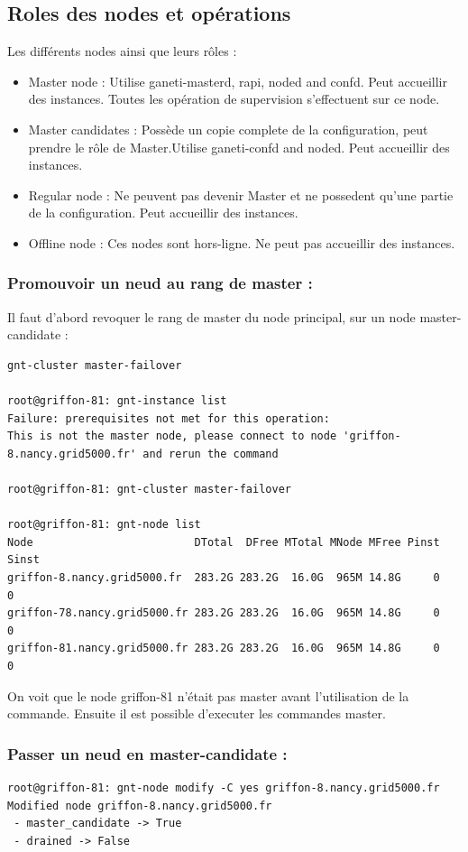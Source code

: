 \subsection {Roles des nodes et opérations}
Les différents nodes ainsi que leurs rôles :
\begin{itemize}
\item Master node : Utilise ganeti-masterd, rapi, noded and confd. Peut accueillir des instances. Toutes les opération de supervision s'effectuent sur ce node.
\item Master candidates : Possède un copie complete de la configuration, peut prendre le rôle de Master.Utilise ganeti-confd and noded. Peut accueillir des instances.
\item Regular node : Ne peuvent pas devenir Master et ne possedent qu'une partie de la configuration. Peut accueillir des instances.
\item Offline node : Ces nodes sont hors-ligne. Ne peut pas accueillir des instances.
\end{itemize}
\subsubsection {Promouvoir un neud au rang de master :}

Il faut d'abord revoquer le rang de master du node principal, sur un node master-candidate :
\begin{lstlisting}
gnt-cluster master-failover

root@griffon-81: gnt-instance list
Failure: prerequisites not met for this operation:
This is not the master node, please connect to node 'griffon-8.nancy.grid5000.fr' and rerun the command

root@griffon-81: gnt-cluster master-failover

root@griffon-81: gnt-node list
Node                         DTotal  DFree MTotal MNode MFree Pinst Sinst
griffon-8.nancy.grid5000.fr  283.2G 283.2G  16.0G  965M 14.8G     0     0
griffon-78.nancy.grid5000.fr 283.2G 283.2G  16.0G  965M 14.8G     0     0
griffon-81.nancy.grid5000.fr 283.2G 283.2G  16.0G  965M 14.8G     0     0
\end{lstlisting}
On voit que le node griffon-81 n'était pas master avant l'utilisation de la commande. Ensuite il est possible d'executer les commandes master.

\subsubsection {Passer un neud en master-candidate :}
\begin{lstlisting}
root@griffon-81: gnt-node modify -C yes griffon-8.nancy.grid5000.fr
Modified node griffon-8.nancy.grid5000.fr
 - master_candidate -> True
 - drained -> False
\end{lstlisting}
